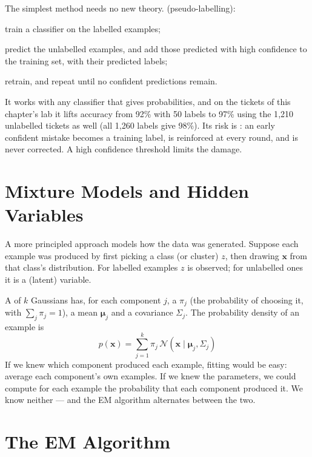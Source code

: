 The simplest method needs no new theory.  (pseudo-labelling):
\begin{tightnum}
  \item train a classifier on the labelled examples;
  \item predict the unlabelled examples, and add those predicted with high
        confidence to the training set, with their predicted labels;
  \item retrain, and repeat until no confident predictions remain.
\end{tightnum}
It works with any classifier that gives probabilities, and on the tickets of this
chapter's lab it lifts accuracy from 92\% with 50 labels to 97\% using the 1{,}210
unlabelled tickets as well (all 1{,}260 labels give 98\%). Its risk is
: an early confident mistake becomes a training label, is
reinforced at every round, and is never corrected. A high confidence threshold
limits the damage.

\section{Mixture Models and Hidden Variables}

A more principled approach models how the data was generated. Suppose each example
was produced by first picking a class (or cluster) $z$, then drawing $\mathbf{x}$
from that class's distribution. For labelled examples $z$ is observed; for
unlabelled ones it is a  (latent) variable.

\begin{definitionbox}
A  of $k$ Gaussians has, for each component $j$, a  $\pi_j$ (the probability of choosing it, with $\sum_j \pi_j = 1$), a mean
$\boldsymbol{\mu}_j$ and a covariance $\Sigma_j$. The probability density of an example
is
\[
p(\mathbf{x}) = \sum_{j=1}^{k} \pi_j\,\mathcal{N}(\mathbf{x} \mid \boldsymbol{\mu}_j, \Sigma_j)
\]
If we knew which component produced each example, fitting would be easy: average
each component's own examples. If we knew the parameters, we could compute for each
example the probability that each component produced it. We know neither --- and
the EM algorithm alternates between the two.
\end{definitionbox}

\section{The EM Algorithm}

